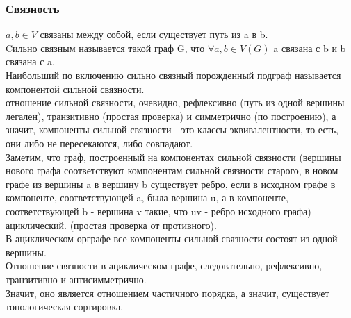 \subsubsection{Связность}
$a, b \in V$ связаны между собой, если существует путь из a в b.\\
Cильно связным называется такой граф G, что $\forall a, b \in V(G)$ a связана с b и b связана с a.\\
Наибольший по включению сильно связный порожденный подграф называется компонентой сильной связности.\\
отношение сильной связности, очевидно, рефлексивно (путь из одной вершины легален), транзитивно (простая проверка) и симметрично (по построению), а значит, компоненты сильной связности - это классы эквивалентности, то есть, они либо не пересекаются, либо совпадают.\\
Заметим, что граф, построенный на компонентах сильной связности (вершины нового графа соответствуют компонентам сильной связности старого, в новом графе из вершины a в вершину b существует ребро, если в исходном графе в компоненте, соответствующей a, была вершина u, а в компоненте, соответствующей b - вершина v такие, что uv - ребро исходного графа) ациклический. (простая проверка от противного).\\
В ациклическом орграфе все компоненты сильной связности состоят из одной вершины.\\
Отношение связности в ациклическом графе, следовательно, рефлексивно, транзитивно и антисимметрично.\\
Значит, оно является отношением частичного порядка, а значит, существует топологическая сортировка.
